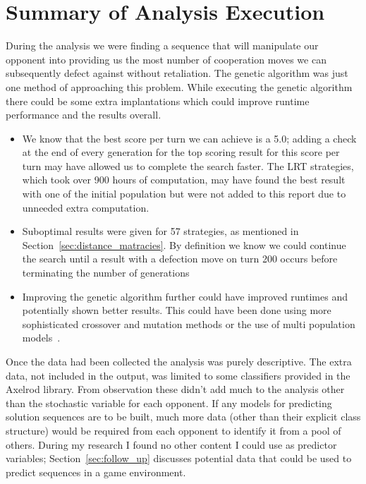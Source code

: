 
\section{Summary of Analysis Execution}\label{sec:conclusion_execution}
During the analysis we were finding a sequence that will manipulate our opponent into providing us the most number of cooperation moves we can subsequently defect against without retaliation.
The genetic algorithm was just one method of approaching this problem.
While executing the genetic algorithm there could be some extra implantations which could improve runtime performance and the results overall.
\begin{itemize}
    \item {We know that the best score per turn we can achieve is a 5.0; adding a check at the end of every generation for the top scoring result for this score per turn may have allowed us to complete the search faster.
    The LRT strategies, which took over 900 hours of computation, may have found the best result with one of the initial population but were not added to this report due to unneeded extra computation.}
    \item {Suboptimal results were given for 57 strategies, as mentioned in Section~\ref{sec:distance_matracies}.
    By definition we know we could continue the search until a result with a defection move on turn 200 occurs before terminating the number of generations} 
    \item {Improving the genetic algorithm further could have improved runtimes and potentially shown better results.
    This could have been done using more sophisticated crossover and mutation methods or the use of multi population models~\cite{whitley2012genetic}.}
\end{itemize}

Once the data had been collected the analysis was purely descriptive.
The extra data, not included in the output, was limited to some classifiers provided in the Axelrod library.
From observation these didn't add much to the analysis other than the stochastic variable for each opponent.
If any models for predicting solution sequences are to be built, much more data (other than their explicit class structure) would be required from each opponent to identify it from a pool of others.
During my research I found no other content I could use as predictor variables; Section~\ref{sec:follow_up} discusses potential data that could be used to predict sequences in a game environment.


